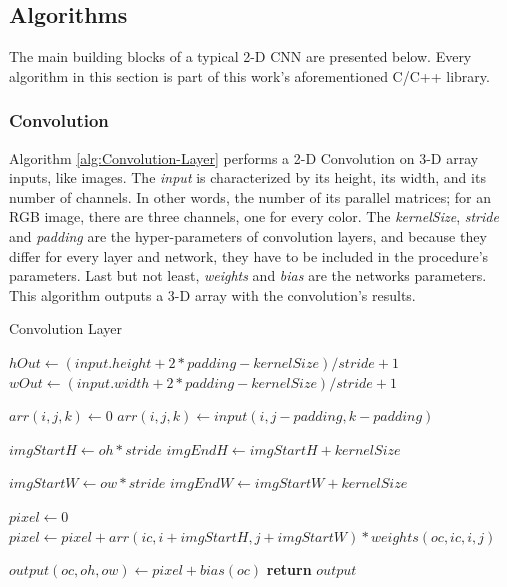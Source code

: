 \subsection{Algorithms}
The main building blocks of a typical 2-D CNN are presented below. Every algorithm in this section is part of this work's aforementioned C/C++ library.

\subsubsection{Convolution}
Algorithm \ref{alg:Convolution-Layer} performs a 2-D Convolution on 3-D array inputs, like images. The \textit{input} is characterized by its height, its width, and its number of channels. In other words, the number of its parallel matrices; for an RGB image, there are three channels, one for every color. The \textit{kernelSize}, \textit{stride} and \textit{padding} are the hyper-parameters of convolution layers, and because they differ for every layer and network, they have to be included in the procedure's parameters. Last but not least, \textit{weights} and \textit{bias} are the networks parameters. This algorithm outputs a 3-D array with the convolution's results.

\begin{algorithm}[H]
	\caption{Convolution Layer}\label{alg:Convolution-Layer}
	\begin{algorithmic}[1]
			\State $hOut \gets (input.height +2 * padding - kernelSize) / stride + 1$
			\State $wOut \gets (input.width +2 * padding - kernelSize) / stride + 1$

							\State $arr(i, j, k) \gets 0$
						\Else{}
							\State $arr(i, j, k) \gets input(i, j - padding, k - padding)$
						\EndIf
					\EndFor
				\EndFor
			\EndFor

			 
					\State $imgStartH \gets oh * stride$
					\State $imgEndH \gets imgStartH + kernelSize$

						\State $imgStartW \gets ow * stride$
						\State $imgEndW \gets imgStartW + kernelSize$

						\State $pixel \gets 0$
									\State $pixel \gets pixel + arr(ic, i + imgStartH, j + imgStartW) * weights(oc, ic, i, j)$
								\EndFor
							\EndFor
						\EndFor

						\State $output(oc, oh, ow) \gets pixel + bias(oc)$
					\EndFor
				\EndFor
			\EndFor
			\State \textbf{return} $output$
		\EndProcedure
	\end{algorithmic}
\end{algorithm}


